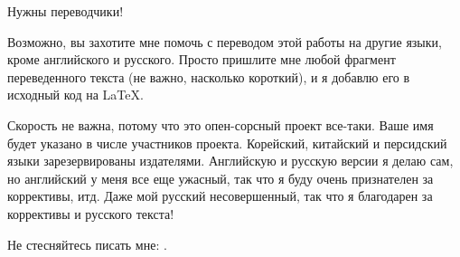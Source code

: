 \vspace*{\fill}

\Huge Нужны переводчики!
\normalsize

\bigskip
\bigskip
\bigskip

Возможно, вы захотите мне помочь с переводом этой работы на другие языки, кроме английского и русского.
Просто пришлите мне любой фрагмент переведенного текста (не важно, насколько короткий), и я добавлю его в исходный код на LaTeX.

\iffalse
Для тех, кто не боится TeX: \href{https://github.com/dennis714/RE-for-beginners/blob/master/Translation.md}{читайте здесь}.
Для тех, кто боится, вы можете просто открыть PDF-файл в OpenOffice и постепенно переписывать каждое предложение.
Я затем скопирую вашу работу назад в исходный код на LaTeX.
Есть даже еще лучше способ: по моему опыту, мотивировать себя можно переводя короткие части текста из моей книги и выкладывая их в своем блоге.
Я могу публиковать URL-ы на ваши посты здесь, а также в моем twitter (\href{http://twitter.com/yurichev}{@yurichev}).
\fi

Скорость не важна, потому что это опен-сорсный проект все-таки.
Ваше имя будет указано в числе участников проекта.
Корейский, китайский и персидский языки зарезервированы издателями.
Английскую и русскую версии я делаю сам, но английский у меня все еще ужасный, так что я буду очень признателен за коррективы, итд.
Даже мой русский несовершенный, так что я благодарен за коррективы и русского текста!

Не стесняйтесь писать мне: \GTT{\EMAIL}.

\vspace*{\fill}
\vfill
